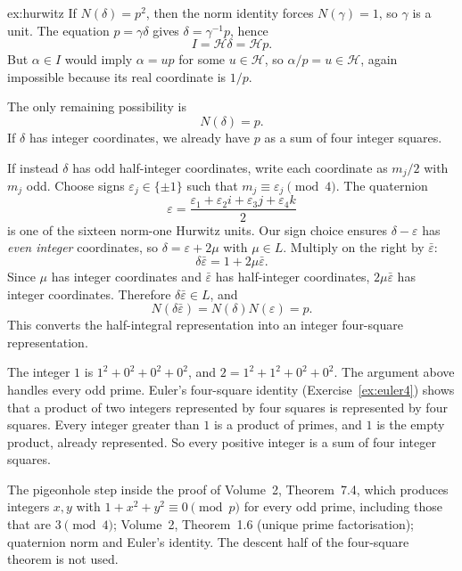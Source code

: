\begin{solution}{ex:hurwitz}
If $N(\delta)=p^2$, then the norm identity forces $N(\gamma)=1$, so $\gamma$ is a unit. The equation $p=\gamma\delta$ gives $\delta=\gamma^{-1}p$, hence
\[
I=\mathcal H\delta=\mathcal Hp.
\]
But $\alpha\in I$ would imply $\alpha=up$ for some $u\in\mathcal H$, so $\alpha/p=u\in\mathcal H$, again impossible because its real coordinate is $1/p$.

The only remaining possibility is
\[
\boxed{N(\delta)=p}.
\]
If $\delta$ has integer coordinates, we already have $p$ as a sum of four integer squares.

If instead $\delta$ has odd half-integer coordinates, write each coordinate as $m_j/2$ with $m_j$ odd. Choose signs $\varepsilon_j\in\{\pm1\}$ such that $m_j\equiv\varepsilon_j\pmod4$. The quaternion
\[
\varepsilon=\frac{\varepsilon_1+\varepsilon_2 i+\varepsilon_3j+\varepsilon_4k}{2}
\]
is one of the sixteen norm-one Hurwitz units. Our sign choice ensures $\delta-\varepsilon$ has \emph{even integer} coordinates, so $\delta=\varepsilon+2\mu$ with $\mu\in L$. Multiply on the right by $\bar\varepsilon$:
\[
\delta\bar\varepsilon=1+2\mu\bar\varepsilon.
\]
Since $\mu$ has integer coordinates and $\bar\varepsilon$ has half-integer coordinates, $2\mu\bar\varepsilon$ has integer coordinates. Therefore $\delta\bar\varepsilon\in L$, and
\[
N(\delta\bar\varepsilon)=N(\delta)N(\varepsilon)=p.
\]
This converts the half-integral representation into an integer four-square representation.

The integer $1$ is $1^2+0^2+0^2+0^2$, and $2=1^2+1^2+0^2+0^2$. The argument above handles every odd prime. Euler's four-square identity (Exercise~\ref{ex:euler4}) shows that a product of two integers represented by four squares is represented by four squares. Every integer greater than $1$ is a product of primes, and $1$ is the empty product, already represented. So every positive integer is a sum of four integer squares.

\tools The pigeonhole step inside the proof of Volume~2, Theorem~7.4, which produces integers $x,y$ with $1+x^2+y^2\equiv0\pmod p$ for every odd prime, including those that are $3\pmod4$; Volume~2, Theorem~1.6 (unique prime factorisation); quaternion norm and Euler's identity. The descent half of the four-square theorem is not used.
\end{solution}

